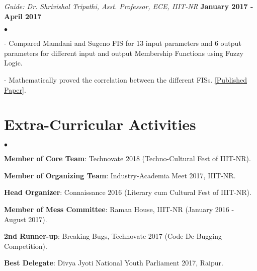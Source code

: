 \documentclass[margin,line]{res}
\newenvironment{list2}{
  \begin{list}{$\bullet$}{%
      \setlength{\itemsep}{0in}
      \setlength{\parsep}{0in} \setlength{\parskip}{0in}
      \setlength{\topsep}{0in} \setlength{\partopsep}{0in} 
      \setlength{\leftmargin}{0.2in}}}{\end{list}}
\begin{document}
\begin{resume}
\vspace{-.3cm}
{\em Guide: Dr. Shrivishal Tripathi, Asst. Professor, ECE, IIIT-NR} \hfill {\bf January 2017 - April 2017}\\
\vspace*{-.4cm}
\begin{list2}
\item[-] Compared Mamdani and Sugeno FIS for 13 input parameters and 6 output parameters for different input and
output Membership Functions using Fuzzy Logic. 
\item[-] Mathematically proved the correlation between the
different FISs.
\textcolor{blue}{\href{https://doi.org/10.1007/s11277-018-6075-9
}{[Published Paper]}}.
\end{list2}



\vspace{-0.1cm}
\section{\sc Extra-Curricular Activities}
\begin{list2}
\item {\bf Member of Core Team}: Technovate 2018 (Techno-Cultural Fest of IIIT-NR).
\item {\bf Member of Organizing Team}: Industry-Academia Meet 2017, IIIT-NR.
\item {\bf Head Organizer}: Connaissance 2016 (Literary cum Cultural Fest of IIIT-NR).
\item {\bf Member of Mess Committee}: Raman House, IIIT-NR (January 2016 - August 2017).
\item {\bf 2nd Runner-up}: Breaking Bugs, Technovate 2017 (Code De-Bugging Competition).
\item {\bf Best Delegate}: Divya Jyoti National Youth Parliament 2017, Raipur.
\end{list2}


\end{resume}
\end{document}
